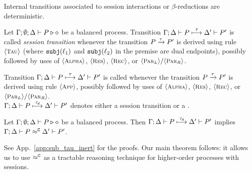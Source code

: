 \documentclass[a4paper,UKenglish]{lipics}
\theoremstyle{definition}
\begin{document}
 
\noi Internal transitions associated to session interactions or  
$\beta$-reductions are deterministic.  
		
\begin{definition}\myrm
\label{def:dettrans}
	Let  $\Gamma; \emptyset; \Delta \vdash P \triangleright \diamond$ be a balanced \HOp process. 
	Transition $\Gamma; \Delta \vdash P \stackrel{\tau}{\longmapsto} \Delta' \vdash P'$ is called
		{\em session transition} whenever the   transition $P \xrightarrow{\tau} P'$ 
		is derived using 
			rule~$\ltsrule{Tau}$ 
		(where $\mathtt{subj}(\ell_1)$ and $\mathtt{subj}(\ell_2)$ in the premise 
		are dual endpoints), 
		possibly followed by uses of  $\ltsrule{Alpha}$, $\ltsrule{Res}$, $\ltsrule{Rec}$, or $\ltsrule{Par${}_L$}/
		\ltsrule{Par${}_R$}$.
		
		Transition $\Gamma; \Delta \vdash P \stackrel{\tau}{\longmapsto} \Delta' \vdash P'$ is called
			{\em \betatran}	whenever the   transition $P \xrightarrow{\tau} P'$
			is derived using rule $\ltsrule{App}$,
			possibly followed by uses of  $\ltsrule{Alpha}$, $\ltsrule{Res}$, $\ltsrule{Rec}$, or $\ltsrule{Par${}_L$}/
		\ltsrule{Par${}_R$}$. \\
%
	 $\Gamma; \Delta \vdash P \stackrel{\tau_{\mathsf{d}}}{\longmapsto} \Delta' \vdash P'$ denotes
	either a session transition or a \betatran.
\end{definition}

\begin{proposition}\myrm
	\label{lem:tau_inert}
Let  $\Gamma; \emptyset; \Delta \vdash P \triangleright \diamond$ be a balanced \HOp process.
	Then
$\Gamma; \Delta \vdash P \stackrel{\tau_{\mathsf{d}}}{\longmapsto} \Delta' \vdash P'$ implies
			$\Gamma; \Delta \vdash P \approx^\mathtt{C} \Delta' \vdash P'$.
\end{proposition}
\noi 
See App.~\ref{app:sub_tau_inert} for the proofs. 
Our main theorem follows: %
it allows us to use $\approx^\mathtt{C}$ as a tractable reasoning %
technique for higher-order processes with sessions.
\end{document}
